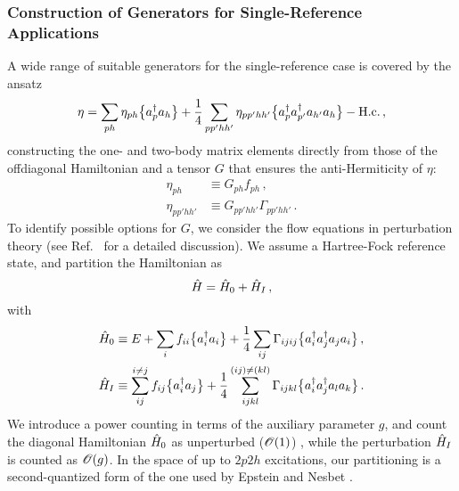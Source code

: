 \subsubsection{\label{sec:imsrg_generator_general}Construction of Generators for Single-Reference Applications}
A wide range of suitable generators for the single-reference case
is covered by the ansatz
\begin{equation}
  \eta= \sum_{ph} \eta_{ph}\big\{a^\dag_{p}a_{h}\big\}
        +\frac{1}{4}\sum_{pp'hh'} \eta_{pp'hh'}\big\{a^\dag_{p}a^\dag_{p'}a_{h'}a_{h}\big\} - \text{H.c.}\,,
\end{equation}
constructing the one- and two-body matrix elements directly from those
of the offdiagonal Hamiltonian and a tensor $G$ that ensures the 
anti-Hermiticity of $\eta$:
\begin{align}
  \eta_{ph}     &\equiv G_{ph} f_{ph}\,,\\
  \eta_{pp'hh'} &\equiv G_{pp'hh'} \Gamma_{pp'hh'}\,.
\end{align}
To identify possible options for $G$, we consider the flow
equations in perturbation theory (see Ref.~\cite{Hergert:2016jk}
for a detailed discussion). We assume a Hartree-Fock reference state,
and partition the Hamiltonian as
\begin{equation}
  \hat{H} = \hat{H}_0 + \hat{H}_I\,,
\end{equation}
with 
\begin{align}
  \hat{H}_0 &\equiv E + \sum_{i} f_{ii}\big\{a^\dag_{i}a_{i}\big\}
                 + \frac{1}{4} \sum_{ij} \Gamma_{ijij}\big\{a^\dag_{i}a^\dag_{j}a_{j}a_{i}\big\}\,,\\
  \hat{H}_I &\equiv \sum_{ij}^{i\neq j} f_{ij}\big\{a^\dag_{i}a_{j}\big\} 
                 + \frac{1}{4} \sum_{ijkl}^{(ij)\neq (kl)} \Gamma_{ijkl}\big\{a^\dag_{i}a^\dag_{j}a_{l}a_{k}\big\}\,.
\end{align}
We introduce a power counting in terms of the auxiliary parameter
$g$, and count the diagonal Hamiltonian $\hat{H}_0$ as unperturbed ($\mathcal{O}(1)$)
, while the perturbation $\hat{H}_I$ is counted as $\mathcal{O}(g)$. In the space of 
up to $2p2h$ excitations, our partitioning is a second-quantized form of 
the one used by Epstein and Nesbet \cite{Epstein:1926fp,Nesbet:1955lq}.

